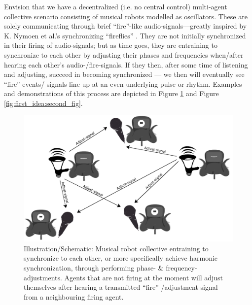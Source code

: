	Envision that we have a decentralized (i.e. no central control) multi-agent collective scenario consisting of musical robots modelled as oscillators. These are solely communicating through brief ``fire''-like audio-signals—greatly inspired by K. Nymoen et al.'s synchronizing ``fireflies'' \cite{nymoen_synch}. They are not initially synchronized in their firing of audio-signals; but as time goes, they are entraining to synchronize to each other by adjusting their phases and frequencies when/after hearing each other's audio-/fire-signals. If they then, after some time of listening and adjusting, succeed in becoming synchronized — we then will eventually see ``fire''-events/-signals line up at an even underlying pulse or rhythm. Examples and demonstrations of this process are depicted in Figure \ref{fig:first_idea:first_fig} and Figure \ref{fig:first_idea:second_fig}.

	\begin{figure}[h]
	\centering
	\includegraphics[width=0.9\linewidth]{Assets/Figures/schematic_initial_idea.pdf}
	\caption{Illustration/Schematic: Musical robot collective entraining to synchronize to each other, or more specifically achieve harmonic synchronization, through performing phase- \& frequency-adjustments. Agents that are not firing at the moment will adjust themselves after hearing a transmitted ``fire''-/adjustment-signal from a neighbouring firing agent.}
	\label{fig:first_idea:first_fig}
	\end{figure}

